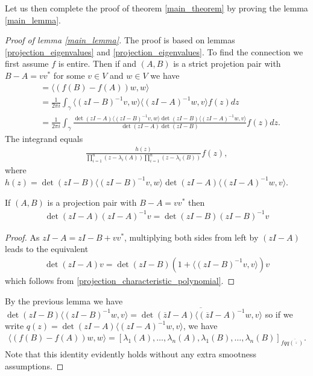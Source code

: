 Let us then complete the proof of theorem \ref{main_theorem} by proving the lemma \ref{main_lemma}.

\begin{proof}[Proof of lemma \ref{main_lemma}]
	The proof is based on lemmas \ref{projection_eigenvalues} and \ref{projection_eigenvalues}. To find the connection we first assume $f$ is entire. Then if and $(A, B)$ is a strict projetion pair with $B - A = v v^{*}$ for some $v \in V$ and $w \in V$ we have
	\begin{align*}
		&= \langle (f(B) - f(A)) w, w \rangle \\
		&= \frac{1}{2 \pi i}\int_{\gamma} \langle (z I - B)^{-1} v, w \rangle  \langle (z I - A)^{-1} w, v \rangle f(z) dz \\
		&= \frac{1}{2 \pi i}\int_{\gamma} \frac{\det(z I - A)\langle (z I - B)^{-1} v, w \rangle \det(z I - B) \langle (z I - A)^{-1} w, v \rangle}{\det(z I - A) \det(z I - B)} f(z) dz.
	\end{align*}
	The integrand equals
	\begin{align*}
		\frac{h(z)}{\prod_{i = 1}^{n}(z - \lambda_{i}(A)) \prod_{i = 1}^{n}(z - \lambda_{i}(B))} f(z),
	\end{align*}
	where $h(z) = \det(z I - B)\langle (z I - B)^{-1} v, w \rangle \det(z I - A) \langle (z I - A)^{-1} w, v \rangle$.
	\begin{lem}
		If $(A, B)$ is a projection pair with $B - A = v v^{*}$ then
		\begin{align*}
			\det(z I - A) (z I - A)^{-1} v = \det(z I - B) (z I - B)^{-1} v
		\end{align*} 
	\end{lem}
	\begin{proof}
		As $z I - A = z I - B + v v^{*}$, multiplying both sides from left by $(z I - A)$ leads to the equivalent
		\begin{align*}
			\det(z I - A) v = \det(z I - B) (1 + \langle (z I - B)^{-1} v, v \rangle) v
		\end{align*}
		which follows from \ref{projection_characteristic_polynomial}.
	\end{proof}
	By the previous lemma we have $\det(z I - B) \langle (z I - B)^{-1} w, v \rangle = \overline{\det(\overline{z} I - A) \langle (\overline{z} I - A)^{-1} w, v \rangle}$ so
	if we write $q(z) = \det(z I - A) \langle (z I - A)^{-1} w, v \rangle$, we have
	\begin{align*}
		\langle (f(B) - f(A)) w, w \rangle = [\lambda_{1}(A), \ldots, \lambda_{n}(A), \lambda_{1}(B), \ldots, \lambda_{n}(B)]_{f q \overline{q(\overline{\cdot})}}.
	\end{align*}
	Note that this identity evidently holds without any extra smootness assumptions.


\end{proof}
